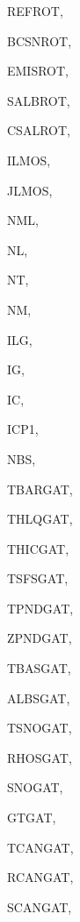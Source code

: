 {\begin{DoxyParamCaption}
\item[{real, dimension (nl,nm)}]{R\+E\+F\+R\+O\+T, }
\item[{real, dimension(nl,nm)}]{B\+C\+S\+N\+R\+O\+T, }
\item[{real, dimension(nl,nm)}]{E\+M\+I\+S\+R\+O\+T, }
\item[{real, dimension(nl,nm,nbs)}]{S\+A\+L\+B\+R\+O\+T, }
\item[{real, dimension(nl,nm,nbs)}]{C\+S\+A\+L\+R\+O\+T, }
\item[{integer, dimension (ilg)}]{I\+L\+M\+O\+S, }
\item[{integer, dimension  (ilg)}]{J\+L\+M\+O\+S, }
\item[{integer}]{N\+M\+L, }
\item[{integer}]{N\+L, }
\item[{integer}]{N\+T, }
\item[{integer}]{N\+M, }
\item[{integer}]{I\+L\+G, }
\item[{integer}]{I\+G, }
\item[{integer}]{I\+C, }
\item[{integer}]{I\+C\+P1, }
\item[{integer}]{N\+B\+S, }
\item[{real, dimension(ilg,ig)}]{T\+B\+A\+R\+G\+A\+T, }
\item[{real, dimension(ilg,ig)}]{T\+H\+L\+Q\+G\+A\+T, }
\item[{real, dimension(ilg,ig)}]{T\+H\+I\+C\+G\+A\+T, }
\item[{real, dimension(ilg,4)}]{T\+S\+F\+S\+G\+A\+T, }
\item[{real, dimension(ilg)}]{T\+P\+N\+D\+G\+A\+T, }
\item[{real, dimension(ilg)}]{Z\+P\+N\+D\+G\+A\+T, }
\item[{real, dimension(ilg)}]{T\+B\+A\+S\+G\+A\+T, }
\item[{real, dimension(ilg)}]{A\+L\+B\+S\+G\+A\+T, }
\item[{real, dimension(ilg)}]{T\+S\+N\+O\+G\+A\+T, }
\item[{real, dimension(ilg)}]{R\+H\+O\+S\+G\+A\+T, }
\item[{real, dimension (ilg)}]{S\+N\+O\+G\+A\+T, }
\item[{real, dimension  (ilg)}]{G\+T\+G\+A\+T, }
\item[{real, dimension(ilg)}]{T\+C\+A\+N\+G\+A\+T, }
\item[{real, dimension(ilg)}]{R\+C\+A\+N\+G\+A\+T, }
\item[{real, dimension(ilg)}]{S\+C\+A\+N\+G\+A\+T, }

\end{DoxyParamCaption}}
